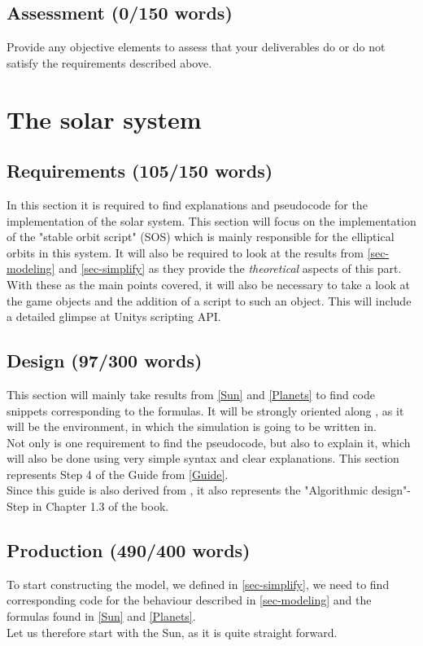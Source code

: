 \documentclass[conference,compsoc]{IEEEtran}
\begin{document}
\subsection{Assessment (0/150 words)}
Provide any objective elements to assess that your deliverables do or do not satisfy the requirements described above. 

\section{The solar system}
\label{sec-solar-system}
\subsection{Requirements (105/150 words)}
In this section it is required to find explanations and pseudocode for the implementation of the solar system. This section will focus on the implementation of the "stable orbit script" (SOS) which is mainly responsible for the elliptical orbits in this system. It will also be required to look at the results from \ref{sec-modeling} and \ref{sec-simplify} as they provide the \emph{theoretical} aspects of this part. With these as the main points covered, it will also be necessary to take a look at the game objects and the addition of a script to such an object. This will include a detailed glimpse at Unitys scripting API. 
\subsection{Design (97/300 words)}
This section will mainly take results from \ref{Sun} and \ref{Planets} to find code snippets corresponding to the formulas. It will be strongly oriented along \cite{UnityDoc}, as it will be the environment, in which the simulation is going to be written in. \\
Not only is one requirement to find the pseudocode, but also to explain it, which will also be done using very simple syntax and clear explanations. This section represents Step 4 of the Guide from \ref{Guide}. \\ Since this guide is also derived from \cite{ComputationalModelsIntroduction}, it also represents the "Algorithmic design"-Step in Chapter 1.3 of the book. 
\subsection{Production (490/400 words)}
To start constructing the model, we defined in \ref{sec-simplify}, we need to find corresponding code for the behaviour described in \ref{sec-modeling} and the formulas found in \ref{Sun} and \ref{Planets}. \\
Let us therefore start with the Sun, as it is quite straight forward.
\end{document}
